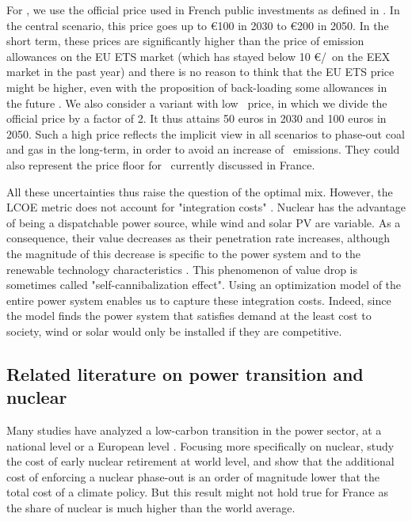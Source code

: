 For \coo, we use the official price used in French public investments as defined in \cite{Quinet2009}. In the central scenario, this price goes up to \euro 100 in 2030 to \euro 200 in 2050. In the short term, these prices are significantly higher than the price of emission allowances on the EU ETS market (which has stayed below 10 \euro/\coo\ on the EEX market in the past year) and there is no reason to think that the EU ETS price might be higher, even with the proposition of back-loading some allowances in the future \citep{Lecuyer2016}. 
We also consider a variant with low \coo\ price, in which we divide the official price by a factor of 2. 
It thus attains 50 euros in 2030 and 100 euros in 2050. Such a high price reflects the implicit view in all scenarios to phase-out coal and gas in the long-term, in order to avoid an increase of \coo\ emissions. They could also represent the price floor for \coo\ currently discussed in France. 

All these uncertainties thus raise the question of the optimal mix. However, the LCOE metric does not account for "integration costs" \citep{Ueckerdt2013}. 
Nuclear has the advantage of being a dispatchable power source, while wind and solar PV are variable. As a consequence, their value decreases as their penetration rate increases, although the magnitude of this decrease is specific to the power system \citep{Hirth2016a} and to the renewable technology characteristics \citep{Hirth2016}. This phenomenon of value drop is sometimes called "self-cannibalization effect". Using an optimization model of the entire power system enables us to capture these integration costs. Indeed, since the model finds the power system that satisfies demand at the least cost to society, wind or solar would only be installed if they are competitive.


\subsection{Related literature on power transition and nuclear}

Many studies have analyzed a low-carbon transition in the power sector, at a national level \citep{Fraunhofer2015} or a European level \citep{Jagemann2013, EuropeanCommission2012}. 
Focusing more specifically on nuclear, \citet{Bauer2012} study the cost of early nuclear retirement at world level, and show that the additional cost of enforcing a nuclear phase-out is an order of magnitude lower that the total cost of a climate policy. But this result might not hold true for France as the share of nuclear is much higher than the world average.

